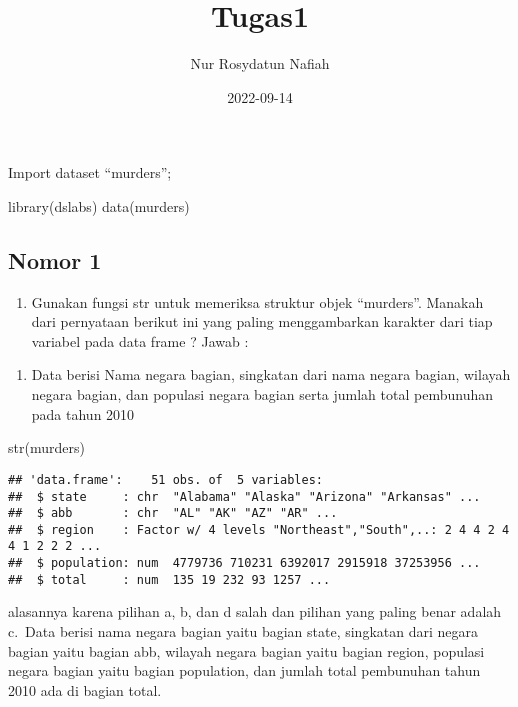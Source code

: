 \documentclass[
]{article}
\title{Tugas1}
\author{Nur Rosydatun Nafiah}
\date{2022-09-14}
\newenvironment{Shaded}{\begin{snugshade}}{\end{snugshade}}
\newcommand{\FunctionTok}[1]{\textcolor[rgb]{0.00,0.00,0.00}{#1}}
\newcommand{\NormalTok}[1]{#1}
\providecommand{\tightlist}{%
  \setlength{\itemsep}{0pt}\setlength{\parskip}{0pt}}
\begin{document}
\maketitle

Import dataset ``murders'';

\begin{Shaded}
\begin{Highlighting}[]
\FunctionTok{library}\NormalTok{(dslabs) }
\FunctionTok{data}\NormalTok{(murders)}
\end{Highlighting}
\end{Shaded}

\hypertarget{nomor-1}{%
\subsection{Nomor 1}\label{nomor-1}}

\begin{enumerate}
\def\labelenumi{\arabic{enumi}.}
\tightlist
\item
  Gunakan fungsi str untuk memeriksa struktur objek ``murders''. Manakah
  dari pernyataan berikut ini yang paling menggambarkan karakter dari
  tiap variabel pada data frame ? Jawab :
\end{enumerate}

\begin{enumerate}
\def\labelenumi{\alph{enumi}.}
\setcounter{enumi}{2}
\tightlist
\item
  Data berisi Nama negara bagian, singkatan dari nama negara bagian,
  wilayah negara bagian, dan populasi negara bagian serta jumlah total
  pembunuhan pada tahun 2010
\end{enumerate}

\begin{Shaded}
\begin{Highlighting}[]
\FunctionTok{str}\NormalTok{(murders)}
\end{Highlighting}
\end{Shaded}

\begin{verbatim}
## 'data.frame':    51 obs. of  5 variables:
##  $ state     : chr  "Alabama" "Alaska" "Arizona" "Arkansas" ...
##  $ abb       : chr  "AL" "AK" "AZ" "AR" ...
##  $ region    : Factor w/ 4 levels "Northeast","South",..: 2 4 4 2 4 4 1 2 2 2 ...
##  $ population: num  4779736 710231 6392017 2915918 37253956 ...
##  $ total     : num  135 19 232 93 1257 ...
\end{verbatim}

alasannya karena pilihan a, b, dan d salah dan pilihan yang paling benar
adalah c.~Data berisi nama negara bagian yaitu bagian state, singkatan
dari negara bagian yaitu bagian abb, wilayah negara bagian yaitu bagian
region, populasi negara bagian yaitu bagian population, dan jumlah total
pembunuhan tahun 2010 ada di bagian total.
\end{document}
